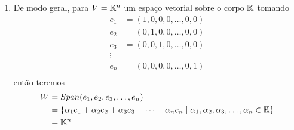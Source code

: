\begin{exemplos}
\begin{enumerate}
        \item\label{exemplokn} De modo geral, para $V = \mathbb{K}^n$ um espaço vetorial sobre o corpo $\mathbb{K}$ tomando
        \begin{align*}
            e_1 &= (1, 0, 0, 0, \dots, 0 , 0)\\
            e_2 &= (0, 1, 0, 0, \dots, 0 , 0)\\
            e_3 &= (0, 0, 1, 0, \dots, 0 , 0)\\
            \vdots\\
            e_n &= (0, 0, 0, 0, \dots, 0 , 1)\\
        \end{align*}
        então teremos
        \begin{align*}
            W &= Span(e_1, e_2, e_3, \dots, e_n) \\ &= \{\alpha_1e_1 + \alpha_2e_2 + \alpha_3e_3 + \cdots + \alpha_ne_n \mid \alpha_1, \alpha_2, \alpha_3, \dots, \alpha_n \in \mathbb{K}\} \\ &= \mathbb{K}^n
        \end{align*}


\end{enumerate}
\end{exemplos}
